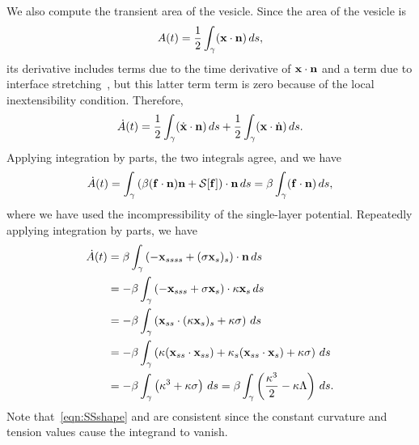 \documentclass[9pt,twocolumn,twoside,lineno]{pnas-new}
\begin{document}
We also compute the transient area of the vesicle. Since the area of the
vesicle is
\begin{align}
  A(t) = \frac{1}{2}\int_{\gamma} (\mathbf{x} \cdot \mathbf{n})\, ds,
  \label{eqn:area}
\end{align}
its derivative includes terms due to the time derivative of $\mathbf{x} \cdot
\mathbf{n}$ and a term due to interface stretching~\cite{lai-tse-hua2008}, but
this latter term term is zero because of the local inextensibility
condition. Therefore,
\begin{align}
  \dot{A}(t) =
  \frac{1}{2} \int_{\gamma} (\dot{\mathbf{x}} \cdot \mathbf{n})\, ds  + 
  \frac{1}{2} \int_{\gamma} (\mathbf{x} \cdot \dot{\mathbf{n}})\, ds.
\end{align}
Applying integration by parts, the two integrals agree, and we have
\begin{align}
  \dot{A}(t) = \int_\gamma \left(\beta (\mathbf{f} \cdot \mathbf{n})\mathbf{n} 
    + \mathcal{S}[\mathbf{f}]\right) \cdot \mathbf{n}\, ds 
  = \beta \int_\gamma (\mathbf{f} \cdot \mathbf{n})\, ds,
\end{align}
where we have used the incompressibility of the single-layer potential.
Repeatedly applying integration by parts, we have
\begin{align}
  \dot{A}(t) &= \beta \int_\gamma \left( -\mathbf{x}_{ssss} + 
    (\sigma \mathbf{x}_s)_s \right) \cdot \mathbf{n} \, ds \\
  &= -\beta \int_\gamma \left(-\mathbf{x}_{sss} + \sigma \mathbf{x}_s 
    \right) \cdot \kappa \mathbf{x}_s \, ds \\
  &= -\beta \int_\gamma \left(\mathbf{x}_{ss} \cdot 
    (\kappa \mathbf{x}_s)_s + \kappa \sigma \right) \, ds \\
  &= -\beta \int_\gamma \left(\kappa (\mathbf{x}_{ss} \cdot \mathbf{x}_{ss}) + 
    \kappa_s (\mathbf{x}_{ss} \cdot \mathbf{x}_s) + \kappa \sigma \right) 
    \, ds \\
  &= -\beta \int_\gamma \left(\kappa^3 + \kappa \sigma \right) 
    \, ds = \beta \int_\gamma \left(
    \frac{\kappa^3}{2} - \kappa \Lambda \right) \, ds.
  \label{eqn:areaROC}
\end{align}
Note that~\eqref{eqn:SSshape} and are consistent since the constant
curvature and tension values cause the integrand to vanish.
\end{document}
